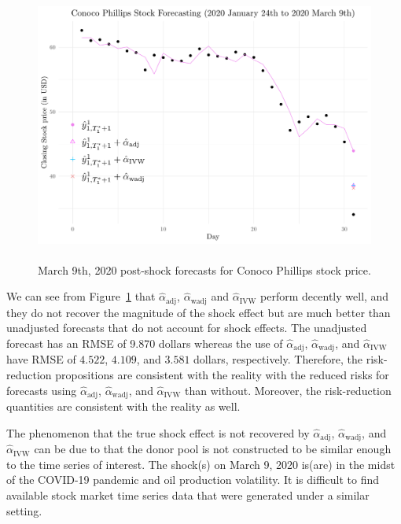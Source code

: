 \documentclass[11pt]{article}
\theoremstyle{definition}
\begin{document}
\begin{figure}
  \begin{center}
    \includegraphics[height = 9cm]{fig2.pdf}
    \caption{March 9th, 2020 post-shock forecasts for Conoco Phillips stock price.}
    \label{Fig:CP}
  \end{center}  
  \vspace{-.6cm}
\end{figure}


We can see from Figure~\ref{Fig:CP} that $\hat{\alpha}_{\text{adj}}$, $\hat{\alpha}_{\text{wadj}}$ and $\hat{\alpha}_{\text{IVW}}$ perform decently well, and they do not recover the magnitude of the shock effect but are much better than unadjusted forecasts that do not account for shock effects. 
The unadjusted forecast has an RMSE of 9.870 dollars whereas 
the use of $\hat{\alpha}_{\text{adj}}$, $\hat{\alpha}_{\text{wadj}}$, and $\hat{\alpha}_{\text{IVW}}$ have  RMSE of $4.522$, $4.109$, and $3.581$ dollars, respectively. 
Therefore, the risk-reduction propositions are consistent with the reality  with the reduced risks for forecasts using  $\hat{\alpha}_{\text{adj}}$, $\hat{\alpha}_{\text{wadj}}$, and $\hat{\alpha}_{\text{IVW}}$ than without. Moreover, the risk-reduction quantities are consistent with the reality as well. 


The phenomenon that the true shock effect is not recovered by $\hat{\alpha}_{\text{adj}}$, $\hat{\alpha}_{\text{wadj}}$, and $\hat{\alpha}_{\text{IVW}}$ can be due to that the donor pool is not constructed to be similar enough to the time series of interest. The shock(s) on March 9, 2020 is(are) in the midst of the COVID-19 pandemic and oil production volatility. It is difficult to find available stock market time series data that were generated under a similar setting.  
\end{document}

